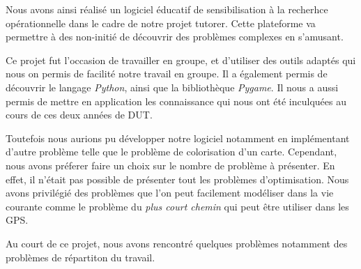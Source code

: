 
Nous avons ainsi réalisé un logiciel éducatif de sensibilisation à la recherhce opérationnelle dans le cadre de notre projet tutorer. 
Cette plateforme va permettre à des non-initié de découvrir  des problèmes complexes en s'amusant. 

Ce projet fut l'occasion de travailler en groupe, et d'utiliser des outils adaptés qui nous on permis de facilité notre travail en groupe. 
Il a également permis de découvrir le langage \emph{Python}, ainsi que la bibliothèque \emph{Pygame}. Il nous a aussi permis de mettre 
en application les connaissance qui nous ont été inculquées au cours de ces deux années de DUT. 

Toutefois nous aurions pu développer notre logiciel notamment en implémentant d'autre problème 
telle que le problème de colorisation d'un carte. Cependant, nous avons préferer faire un choix sur le nombre de problème à présenter.  
En effet, il n'était pas possible de présenter tout les problèmes d'optimisation. Nous avons privilégié des problèmes que l'on peut facilement modéliser dans la 
vie courante comme le problème du \emph{plus court chemin} qui peut être utiliser dans les GPS.

Au court de ce projet, nous avons rencontré quelques problèmes notamment des problèmes de répartiton du travail. 

